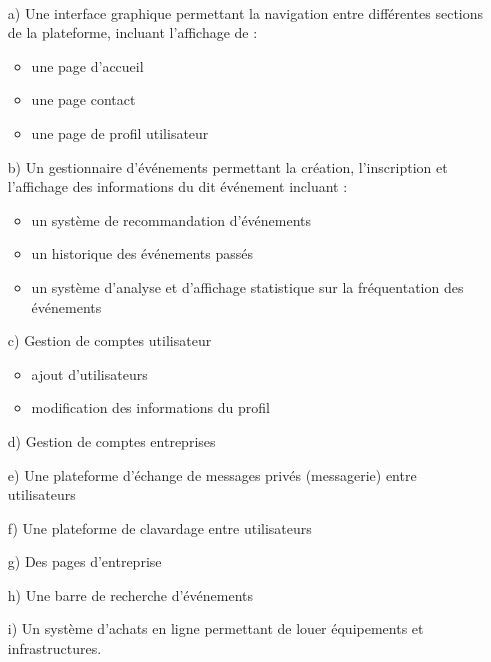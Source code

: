 \documentclass[letter,12pt]{exam}
\begin{document}
\vspace{0.5cm}
\\

\begin{itemize}
\tightlist
\item[a)]
  Une interface graphique permettant la navigation entre différentes
  sections de la plateforme, incluant l'affichage de :

  \begin{itemize}
  \tightlist
  \item
    une page d'accueil
  \item
    une page contact
  \item
    une page de profil utilisateur
  \end{itemize}
  
\newpage
\item[b)]
  Un gestionnaire d'événements permettant la création, l'inscription et
  l'affichage des informations du dit événement incluant :

  \begin{itemize}
  \tightlist
  \item
    un système de recommandation d'événements
  \item
    un historique des événements passés
  \item
    un système d'analyse et d'affichage statistique sur la fréquentation
    des événements
  \end{itemize}
\item[c)]
  Gestion de comptes utilisateur

  \begin{itemize}
  \tightlist
  \item
    ajout d'utilisateurs
  \item
    modification des informations du profil
  \end{itemize}
\item[d)]
  Gestion de comptes entreprises
\item[e)]
  Une plateforme d'échange de messages privés (messagerie) entre
  utilisateurs
\item[f)]
  Une plateforme de clavardage entre utilisateurs
\item[g)]
  Des pages d'entreprise
\item[h)]
  Une barre de recherche d'événements
\item[i)]
  Un système d'achats en ligne permettant de louer équipements et
  infrastructures.
\end{itemize}
\end{document}
